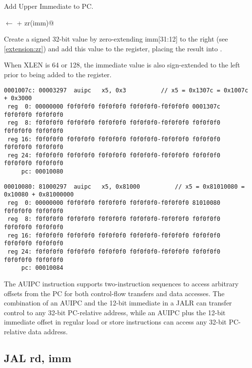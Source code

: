 Add Upper Immediate to PC.

\verb@rd@ $\leftarrow$ \verb@pc + zr(imm)@

Create a signed 32-bit value by zero-extending imm[31:12] to the 
right (see \autoref{extension:zr}) and add this value to the 
 register, placing the result into .

When XLEN is 64 or 128, the immediate value is also sign-extended 
to the left prior to being added to the  register.

\begin{verbatim}
0001007c: 00003297  auipc   x5, 0x3          // x5 = 0x1307c = 0x1007c + 0x3000
 reg  0: 00000000 f0f0f0f0 f0f0f0f0 f0f0f0f0-f0f0f0f0 0001307c f0f0f0f0 f0f0f0f0
 reg  8: f0f0f0f0 f0f0f0f0 f0f0f0f0 f0f0f0f0-f0f0f0f0 f0f0f0f0 f0f0f0f0 f0f0f0f0
 reg 16: f0f0f0f0 f0f0f0f0 f0f0f0f0 f0f0f0f0-f0f0f0f0 f0f0f0f0 f0f0f0f0 f0f0f0f0
 reg 24: f0f0f0f0 f0f0f0f0 f0f0f0f0 f0f0f0f0-f0f0f0f0 f0f0f0f0 f0f0f0f0 f0f0f0f0
     pc: 00010080
\end{verbatim}

\begin{verbatim}
00010080: 81000297  auipc   x5, 0x81000          // x5 = 0x81010080 = 0x10080 + 0x81000000
 reg  0: 00000000 f0f0f0f0 f0f0f0f0 f0f0f0f0-f0f0f0f0 81010080 f0f0f0f0 f0f0f0f0
 reg  8: f0f0f0f0 f0f0f0f0 f0f0f0f0 f0f0f0f0-f0f0f0f0 f0f0f0f0 f0f0f0f0 f0f0f0f0
 reg 16: f0f0f0f0 f0f0f0f0 f0f0f0f0 f0f0f0f0-f0f0f0f0 f0f0f0f0 f0f0f0f0 f0f0f0f0
 reg 24: f0f0f0f0 f0f0f0f0 f0f0f0f0 f0f0f0f0-f0f0f0f0 f0f0f0f0 f0f0f0f0 f0f0f0f0
     pc: 00010084
\end{verbatim}


The AUIPC instruction supports two-instruction sequences to access arbitrary 
offsets from the PC for both control-flow transfers and data accesses. 
The combination of an AUIPC and the 12-bit immediate in a JALR can transfer 
control to any 32-bit PC-relative address, while an AUIPC plus the 12-bit 
immediate offset in regular load or store instructions can access any 32-bit 
PC-relative data address.~\cite[p.~14]{rvismv1v22:2017}


\subsection{JAL rd, imm}

